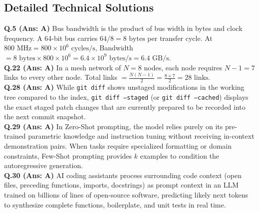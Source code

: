 \vspace{3mm}
\subsection*{Detailed Technical Solutions}

\begin{solutionbox}
\textbf{Q.5 (Ans: A)} Bus bandwidth is the product of bus width in bytes and clock frequency. A 64-bit bus carries $64 / 8 = 8\text{ bytes}$ per transfer cycle. At $800\text{ MHz} = 800 \times 10^6\text{ cycles/s}$, Bandwidth $= 8\text{ bytes} \times 800 \times 10^6 = 6.4 \times 10^9\text{ bytes/s} = 6.4\text{ GB/s}$.\\[2mm]
\textbf{Q.22 (Ans: A)} In a mesh network of $N = 8$ nodes, each node requires $N - 1 = 7$ links to every other node. Total links $= \frac{N(N - 1)}{2} = \frac{8 \times 7}{2} = 28\text{ links}$.\\[2mm]
\textbf{Q.28 (Ans: A)} While \texttt{git diff} shows unstaged modifications in the working tree compared to the index, \texttt{git diff --staged} (or \texttt{git diff --cached}) displays the exact staged patch changes that are currently prepared to be recorded into the next commit snapshot.\\[2mm]
\textbf{Q.29 (Ans: A)} In Zero-Shot prompting, the model relies purely on its pre-trained parametric knowledge and instruction tuning without receiving in-context demonstration pairs. When tasks require specialized formatting or domain constraints, Few-Shot prompting provides $k$ examples to condition the autoregressive generation.\\[2mm]
\textbf{Q.30 (Ans: A)} AI coding assistants process surrounding code context (open files, preceding functions, imports, docstrings) as prompt context in an LLM trained on billions of lines of open-source software, predicting likely next tokens to synthesize complete functions, boilerplate, and unit tests in real time.
\end{solutionbox}

\newpage
